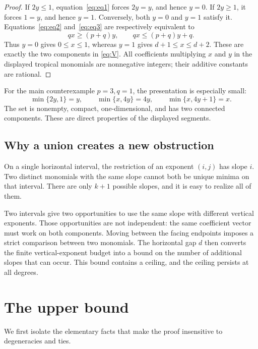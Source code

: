 \documentclass[11pt,a4paper]{article}
\numberwithin{equation}{section}
\theoremstyle{definition}
\theoremstyle{remark}
\begin{document}
\begin{proof}
If $2y\leq1$, equation~\eqref{eq:eq1} forces $2y=y$, and hence $y=0$.
If $2y\geq1$, it forces $1=y$, and hence $y=1$. Conversely, both $y=0$ and
$y=1$ satisfy it. Equations~\eqref{eq:eq2} and~\eqref{eq:eq3} are respectively
equivalent to
\[
qx\geq(p+q)y,\qquad qx\leq(p+q)y+q.
\]
Thus $y=0$ gives $0\leq x\leq1$, whereas $y=1$ gives
$d+1\leq x\leq d+2$. These are exactly the two components in \eqref{eq:V}.
All coefficients multiplying $x$ and $y$ in the displayed tropical monomials
are nonnegative integers; their additive constants are rational.
\end{proof}

For the main counterexample $p=3,q=1$, the presentation is especially small:
\begin{equation}
\label{eq:eqd3}
\min\{2y,1\}=y,\qquad
\min\{x,4y\}=4y,\qquad
\min\{x,4y+1\}=x.
\end{equation}
The set is nonempty, compact, one-dimensional, and has two connected
components. These are direct properties of the displayed segments.

\subsection{Why a union creates a new obstruction}

On a single horizontal interval, the restriction of an exponent $(i,j)$ has
slope $i$. Two distinct monomials with the same slope cannot both be unique
minima on that interval. There are only $k+1$ possible slopes, and it is easy
to realize all of them.

Two intervals give two opportunities to use the same slope with different
vertical exponents. Those opportunities are not independent: the same
coefficient vector must work on both components. Moving between the facing
endpoints imposes a strict comparison between two monomials. The horizontal
gap $d$ then converts the finite vertical-exponent budget into a bound on the
number of additional slopes that can occur. This bound contains a ceiling,
and the ceiling persists at all degrees.

\section{The upper bound}
\label{sec:upper}

We first isolate the elementary facts that make the proof insensitive to
degeneracies and ties.
\end{document}
